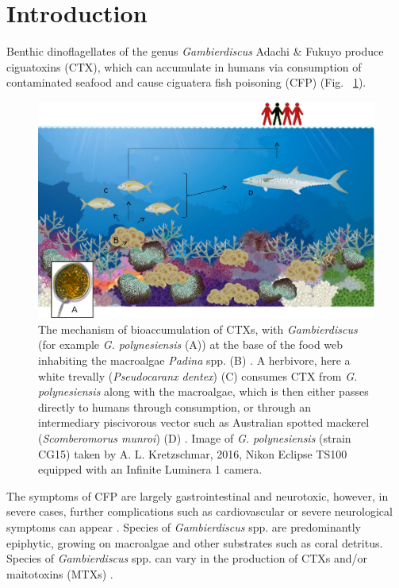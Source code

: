 \documentclass[12pt]{article}
\begin{document}
\section*{Introduction}
\FloatBarrier
Benthic dinoflagellates of the genus \emph{Gambierdiscus} Adachi \& Fukuyo produce ciguatoxins (CTX), which can accumulate in humans via consumption of contaminated seafood and cause ciguatera fish poisoning (CFP) (Fig. ~\ref{fig:bioaccom}). 
\begin{figure} 
\includegraphics[scale=.55]{Hero_qpcr-figs/Fig1.png} 
\caption{The mechanism of bioaccumulation of CTXs, with \textit{Gambierdiscus} (for example \emph{G. polynesiensis} (A)) at the base of the food web inhabiting the macroalgae \emph{Padina} spp. (B) \cite{padina}. 
A herbivore, here a white trevally (\emph{Pseudocaranx dentex}) (C) \cite{trevally} consumes CTX from \emph{G. polynesiensis} along with the macroalgae, which is then either passes directly to humans through consumption, or through an intermediary piscivorous vector such as Australian spotted mackerel (\emph{Scomberomorus munroi}) (D) \cite{mackerel}. 
Image of \emph{G. polynesiensis} (strain CG15) taken by A. L. Kretzschmar, 2016, Nikon Eclipse TS100 equipped with an Infinite Luminera 1 camera.} 
\label{fig:bioaccom}
\end{figure} 
The symptoms of CFP are largely gastrointestinal and neurotoxic, however, in severe cases, further complications such as cardiovascular or severe neurological symptoms can appear \citep{sims1987theoretical}. 
Species of \emph{Gambierdiscus} spp. are predominantly epiphytic, growing on macroalgae and other substrates such as coral detritus. 
Species of \textit{Gambierdiscus} spp. can vary in the production of CTXs and/or maitotoxins (MTXs) \citep{chinain2010ciguatera,kohli2014high}. 
\end{document}
